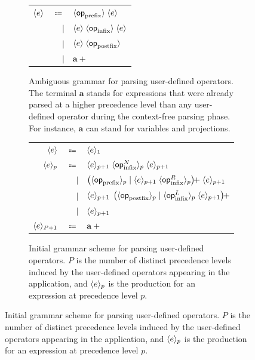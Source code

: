 {\newcommand{\prefix}{\mathsf{op}_{\text{prefix}}}
\newcommand{\infix}{\mathsf{op}_{\text{infix}}}
\newcommand{\infixl}{\mathsf{op}_{\text{infix}}^L}
\newcommand{\infixr}{\mathsf{op}_{\text{infix}}^R}
\newcommand{\infixn}{\mathsf{op}_{\text{infix}}^N}
\newcommand{\postfix}{\mathsf{op}_{\text{postfix}}}
\begin{figure}[H]
\begin{subfigure}{\linewidth}
\centering
\begin{tabular}{rrl}
$ \langle e\rangle $ & $ \Coloneqq $ & $ \angled{\prefix} \; \angled{e} $\\
& $ \mid $ & $ \angled{e} \; \angled{\infix} \; \angled{e} $\\
& $ \mid $ & $ \angled{e} \; \angled{\postfix} $\\
& $ \mid $ & $ \mathbf{a}+ $
\end{tabular}
\caption{Ambiguous grammar for parsing user-defined operators. The terminal $ \mathbf{a} $ stands for expressions that were already parsed at a higher precedence level than any user-defined operator during the context-free parsing phase.
For instance, $ \mathbf{a} $ can stand for variables and projections.}
\label{figure:user-defined-operators-initial-grammar}
\end{subfigure}
\par\bigskip
\begin{subfigure}{\linewidth}
\centering
\begin{tabular}{rrl}
$ \langle e\rangle $ & $ \Coloneqq $ & $ \langle e\rangle_1 $\\
$ \langle e\rangle_p $ & $ \Coloneqq $ & $ \angled{e}_{p + 1} \; \angled{\infixn}_p \; \angled{e}_{p + 1} $\\
& $ \mid $ & $ \left(\angled{\prefix}_p \mid \angled{e}_{p + 1} \; \angled{\infixr}_p\right)\hspace{-0.3em}{+} \; \angled{e}_{p + 1} $\\
& $ \mid $ & $ \angled{e}_{p + 1} \; \left(\angled{\postfix}_p \mid \angled{\infixl}_p \; \angled{e}_{p + 1}\right)\hspace{-0.3em}{+} $\\
& $ \mid $ & $ \langle e\rangle_{p + 1} $\\
$ \langle e\rangle_{P + 1} $ & $ \Coloneqq $ & $ \mathbf{a}+ $
\end{tabular}
\caption{%
Initial grammar scheme for parsing user-defined operators.
$ P $ is the number of distinct precedence levels induced by the user-defined operators appearing in the application, and $ \langle e\rangle_p $ is the production for an expression at precedence level $ p $.
}
\end{subfigure}
\end{figure}}

